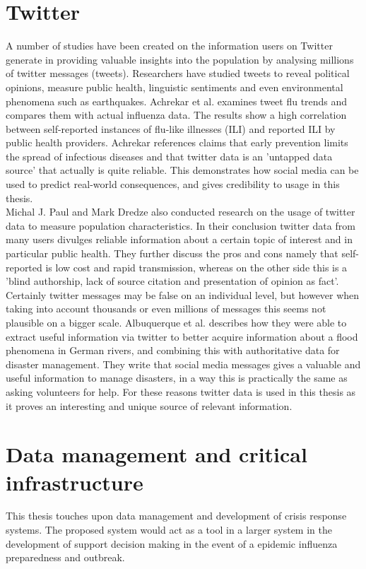 \section{Twitter}
A number of studies have been created on the information users on Twitter generate in providing valuable insights into the population by analysing millions of twitter messages (tweets). Researchers have studied tweets to reveal political opinions\cite{twitter_politic}, measure public health\cite{twitter_flu_trends}, linguistic sentiments\cite{twitter_linguistics} and even environmental phenomena such as earthquakes\cite{twitter_earthQuake}. Achrekar et al.\cite{twitter_flu_trends} examines tweet flu trends and compares them with actual influenza data. The results show a high correlation between self-reported instances of flu-like illnesses (ILI) and reported ILI by public health providers. Achrekar references claims that early prevention limits the spread of infectious diseases and that twitter data is an 'untapped data source' that actually is quite reliable. This demonstrates how social media can be  used to predict real-world consequences, and gives credibility to usage in this thesis. \\Michal J. Paul and Mark Dredze \cite{twitter_what_you_tweet} also conducted research on the usage of twitter data to measure population characteristics. In their conclusion twitter data from many users divulges reliable information about a certain topic of interest and in particular public health. They further discuss the pros and cons namely that self-reported is low cost and rapid transmission, whereas on the other side this is a 'blind authorship, lack of source citation and presentation of opinion as fact'. Certainly twitter messages may be false on an individual level, but however when taking into account thousands or even millions of messages this seems not plausible on a bigger scale. Albuquerque et al. \cite{de2015geographic} describes how they were able to extract useful information via twitter to better acquire information about a flood phenomena in German rivers, and combining this with authoritative data for disaster management. They write that social media messages gives a valuable and useful information to manage disasters, in a way this is practically the same as asking volunteers for help. For these reasons twitter data is used in this thesis as it proves an interesting and unique source of relevant information.

\section{Data management and critical infrastructure}
This thesis touches upon data management and development of crisis response systems. The proposed system would act as a tool in a larger system in the development of support decision making in the event of a epidemic influenza preparedness and outbreak. 

